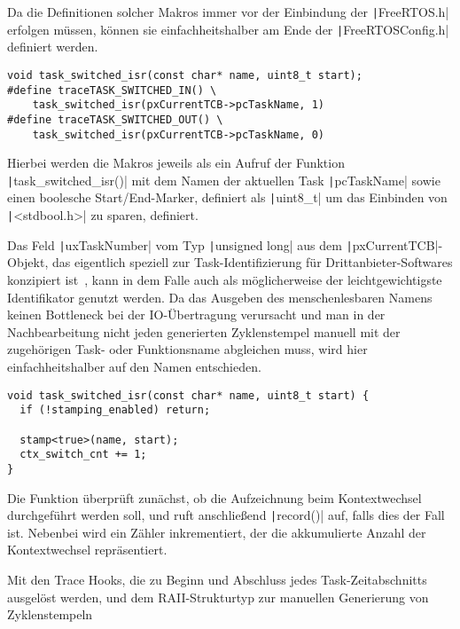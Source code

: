 Da die Definitionen solcher Makros immer vor der Einbindung der
\texttt|FreeRTOS.h| erfolgen müssen, können sie einfachheitshalber
am Ende der \texttt|FreeRTOSConfig.h| definiert werden.

\begin{code}
\begin{verbatim}
void task_switched_isr(const char* name, uint8_t start);
#define traceTASK_SWITCHED_IN() \
    task_switched_isr(pxCurrentTCB->pcTaskName, 1)
#define traceTASK_SWITCHED_OUT() \
    task_switched_isr(pxCurrentTCB->pcTaskName, 0)
\end{verbatim}
\end{code}

Hierbei werden die Makros jeweils als ein Aufruf der Funktion
\texttt|task_switched_isr()| mit dem Namen der aktuellen Task
\texttt|pcTaskName| sowie einen boolesche Start/End-Marker, definiert
als \texttt|uint8_t| um das Einbinden von \texttt|<stdbool.h>|
zu sparen, definiert.

Das Feld \texttt|uxTaskNumber| vom Typ \texttt|unsigned long|
aus dem \texttt|pxCurrentTCB|-Objekt, das eigentlich speziell zur
Task-Identifizierung für Drittanbieter-Softwares konzipiert
ist~\cite{freertos_task_c_410}, kann in dem Falle auch als möglicherweise der
leichtgewichtigste Identifikator genutzt werden. Da das Ausgeben des
menschenlesbaren Namens keinen Bottleneck bei der IO-Übertragung verursacht und
man in der Nachbearbeitung nicht jeden generierten Zyklenstempel manuell mit der
zugehörigen Task- oder Funktionsname abgleichen muss, wird hier
einfachheitshalber auf den Namen entschieden.

\begin{code}
\begin{verbatim}
void task_switched_isr(const char* name, uint8_t start) {
  if (!stamping_enabled) return;

  stamp<true>(name, start);
  ctx_switch_cnt += 1;
}
\end{verbatim}
\end{code}

Die Funktion überprüft zunächst, ob die Aufzeichnung beim Kontextwechsel
durchgeführt werden soll, und ruft anschließend \texttt|record()| auf,
falls dies der Fall ist. Nebenbei wird ein Zähler inkrementiert, der die
akkumulierte Anzahl der Kontextwechsel repräsentiert.


Mit den Trace Hooks, die zu Beginn und Abschluss jedes Task-Zeitabschnitts
ausgelöst werden, und dem RAII-Strukturtyp zur manuellen Generierung von
Zyklenstempeln
